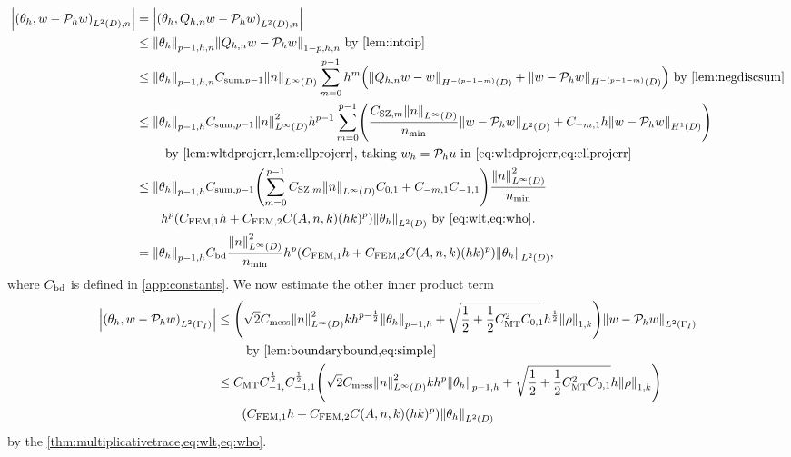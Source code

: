 \begin{align}
\abs{\IPLtDn{\thetah}{w- \Ph w}} &= \abs{\IPLtDn{\thetah}{\Qhn w - \Ph w}}\nonumber\\
&\leq \Nfn{p-1,h,n}{\thetah}\Nfn{1-p,h,n}{\Qhn w - \Ph w}\text{ by \cref{lem:intoip}}\nonumber\\
&\leq \Nfn{p-1,h,n}{\thetah} \Csumfn{p-1} \NLiD{n} \sum_{m=0}^{p-1} h^{m}\mleft(\NHfn{-(p-1-m)}{D}{\Qhn w - w} + \NHfn{-(p-1-m)}{D}{w - \Ph w}\mright) \text{ by \cref{lem:negdiscsum}}\nonumber\\
&\leq \Nfn{p-1,h}{\thetah} \Csumfn{p-1} \NLiD{n}^2 h^{p-1} \sum_{m=0}^{p-1} \mleft(\frac{\CSZfn{m} \NLiD{n}}{\nmin} \NLtD{w - \Ph w} + \Cfn{-m,1} h \NHoD{w - \Ph w}\mright)\\
&\quad\quad\text{ by \cref{lem:wltdprojerr,lem:ellprojerr}, taking $\wh = \Ph u$ in \cref{eq:wltdprojerr,eq:ellprojerr}}\nonumber\\
&\leq \Nfn{p-1,h}{\thetah} \Csumfn{p-1}\mleft(\sum_{m=0}^{p-1} \CSZfn{m} \NLiD{n}\Cfn{0,1} + \Cfn{-m,1}\Cfn{-1,1}\mright) \frac{\NLiD{n}^2}{\nmin}\\
&\quad\quad h^p \mleft(\CFEMotilde h + \CFEMttilde \CAnk (hk)^p\mright) \NLtD{\thetah} \text{ by \cref{eq:wlt,eq:who}}.\nonumber\\
&=\Nfn{p-1,h}{\thetah}  \Cfourteen \frac{\NLiD{n}^2}{\nmin} h^p \mleft(\CFEMotilde h + \CFEMttilde \CAnk (hk)^p\mright) \NLtD{\thetah} \label{eq:innerprod1},
\end{align}
where $C_{\mathrm{bd}}$ is defined in \cref{app:constants}. We now estimate the other inner product term
\begin{align}
\abs{\IPLtGI{\thetah}{w - \Ph w}} &\leq \mleft(\sqrt{2} \Cmess\NLiD{n}^2 k h^{p-\half} \Nfn{p-1,h}{\thetah} + \sqrt{\half + \half \CMT^2 \Cfn{0,1}} h^{\half} \NW{\rho}\mright) \NLtGI{w - \Ph w}\\
&\quad\quad\text{ by \cref{lem:boundarybound,eq:simple}}\nonumber\\
&\leq \CMT \Cfn{-1,}^{\half}\Cfn{-1,1}^{\half} \mleft(\sqrt{2} \Cmess \NLiD{n}^2 kh^p \Nfn{p-1,h}{\thetah} + \sqrt{\half + \half \CMT^2 \Cfn{0,1}} h \NW{\rho}\mright)\nonumber\\
&\quad\quad\mleft(\CFEMotilde h + \CFEMttilde \CAnk (hk)^p\mright) \NLtD{\thetah}\label{eq:innerprod2}
\end{align}
 by the \cref{thm:multiplicativetrace,eq:wlt,eq:who}.

